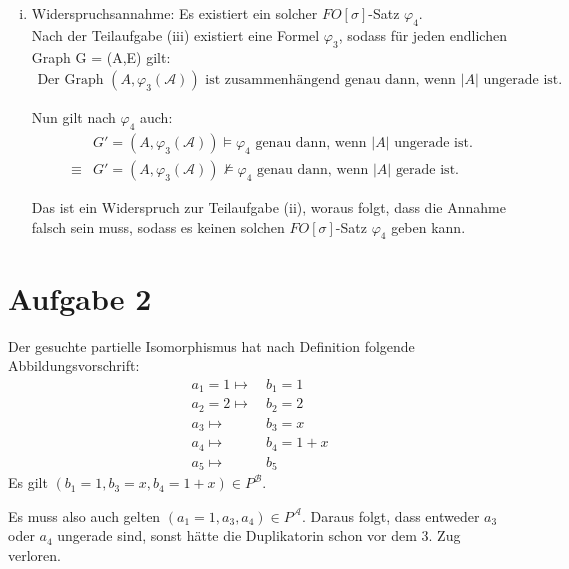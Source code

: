 \documentclass[a4paper,10pt]{article}
\begin{document}
\begin{enumerate}[(i)]
		\item
			Widerspruchsannahme: Es existiert ein solcher $FO[\sigma]$-Satz $\varphi_4$. \\
			
			Nach der Teilaufgabe (iii) existiert eine Formel $\varphi_3$, sodass für jeden 				endlichen Graph G = (A,E) gilt:
			\begin{align*}
				\text{Der Graph } (A, \varphi_3(\mathcal{A})) \text{ ist zusammenhängend genau dann, wenn $|A|$ ungerade ist.}
			\end{align*}
			
			Nun gilt nach $\varphi_4$ auch:
			\begin{align*}
				&G' = (A,\varphi_3(\mathcal{A})) \vDash \varphi_4 \text{ genau dann, wenn $|A|$ ungerade ist.} \\
				\equiv%
				&G' = (A,\varphi_3(\mathcal{A})) \nvDash \varphi_4 \text{ genau dann, wenn $|A|$ gerade ist.} 
			\end{align*}
			
			Das ist ein Widerspruch zur Teilaufgabe (ii), woraus folgt, dass die Annahme falsch sein muss, sodass es keinen solchen 							$FO[\sigma]$-Satz $\varphi_4$ geben kann.
	\end{enumerate}
\section*{Aufgabe 2}
Der gesuchte partielle Isomorphismus hat nach Definition folgende Abbildungsvorschrift:
\begin{align*}
a_1 = 1 \mapsto & ~ b_1 = 1 \\
a_2 = 2 \mapsto &  ~ b_2 = 2 \\
a_3 \mapsto & ~ b_3 = x \\
a_4 \mapsto & ~ b_4 = 1 + x \\
a_5 \mapsto & ~ b_5
\end{align*}
Es gilt $\left(b_1 = 1,b_3 = x,b_4 = 1+x\right) \in P^{\mathcal B}$.

Es muss also auch gelten $\left(a_1 = 1,a_3,a_4\right) \in P^{\mathcal A}$. Daraus folgt, dass entweder $a_3$ oder $a_4$ ungerade sind, sonst hätte die Duplikatorin schon vor dem 3. Zug verloren.\\
\end{document}
